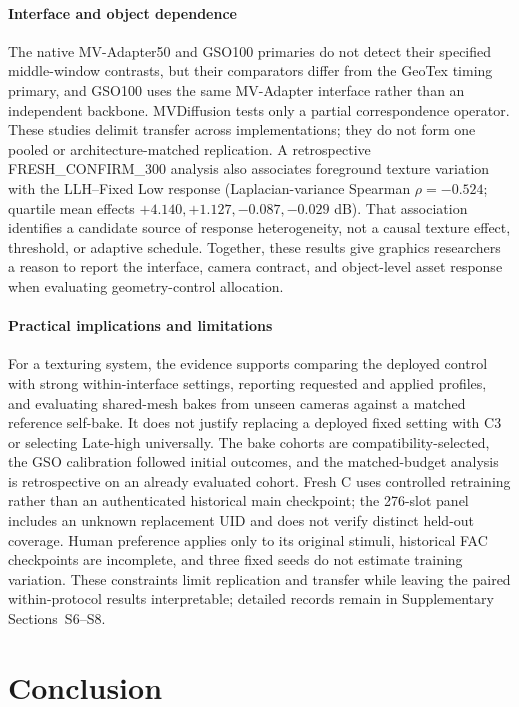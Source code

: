 \documentclass[times,twocolumn,final]{elsarticle}
\begin{document}
\paragraph{Interface and object dependence}
The native MV-Adapter50 and GSO100 primaries do not detect their specified middle-window contrasts, but their comparators differ from the GeoTex timing primary, and GSO100 uses the same MV-Adapter interface rather than an independent backbone. MVDiffusion tests only a partial correspondence operator. These studies delimit transfer across implementations; they do not form one pooled or architecture-matched replication. A retrospective FRESH\_CONFIRM\_300 analysis also associates foreground texture variation with the LLH--Fixed Low response (Laplacian-variance Spearman $\rho=-0.524$; quartile mean effects $+4.140,+1.127,-0.087,-0.029$ dB). That association identifies a candidate source of response heterogeneity, not a causal texture effect, threshold, or adaptive schedule. Together, these results give graphics researchers a reason to report the interface, camera contract, and object-level asset response when evaluating geometry-control allocation.

\paragraph{Practical implications and limitations}
For a texturing system, the evidence supports comparing the deployed control with strong within-interface settings, reporting requested and applied profiles, and evaluating shared-mesh bakes from unseen cameras against a matched reference self-bake. It does not justify replacing a deployed fixed setting with C3 or selecting Late-high universally. The bake cohorts are compatibility-selected, the GSO calibration followed initial outcomes, and the matched-budget analysis is retrospective on an already evaluated cohort. Fresh C uses controlled retraining rather than an authenticated historical main checkpoint; the 276-slot panel includes an unknown replacement UID and does not verify distinct held-out coverage. Human preference applies only to its original stimuli, historical FAC checkpoints are incomplete, and three fixed seeds do not estimate training variation. These constraints limit replication and transfer while leaving the paired within-protocol results interpretable; detailed records remain in Supplementary Sections~S6--S8.

\section{Conclusion}
\label{sec:conclusion}
\end{document}
